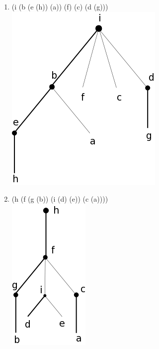 \documentclass[a4paper, 11pt]{article}
\begin{document}
\begin{enumerate}
    \item (i (b (e (h)) (a)) (f) (c) (d (g)))\\\includegraphics[scale=0.3]{reponse5.png}
    \item (h (f (g (b)) (i (d) (e)) (c (a))))\\\includegraphics[scale=0.3]{reponse6.png}
\end{enumerate}
\end{document}
